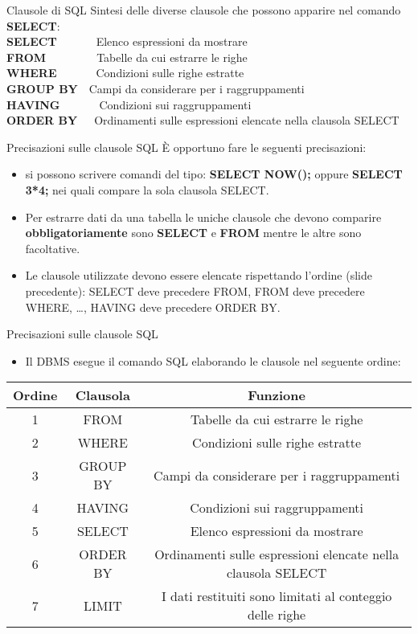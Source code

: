 \begin{frame}{Clausole di SQL}
Sintesi delle diverse clausole che possono apparire nel comando \textbf{SELECT}:
\newline
\\\textbf{SELECT}~~~~~~~Elenco espressioni da mostrare
\\\textbf{FROM}~~~~~~~~~Tabelle da cui estrarre le righe
\\\textbf{WHERE}~~~~~~~Condizioni sulle righe estratte
\\\textbf{GROUP BY}~~Campi da considerare per i raggruppamenti
\\\textbf{HAVING}~~~~~~~Condizioni sui raggruppamenti
\\\textbf{ORDER BY}~~~Ordinamenti sulle espressioni elencate nella clausola SELECT
\end{frame}
%
\begin{frame}{Precisazioni sulle clausole SQL}
\`E opportuno fare le seguenti precisazioni:
\begin{itemize}[<+->]
    \item si possono scrivere comandi del tipo: \textbf{SELECT NOW();} oppure \textbf{SELECT 3*4;} nei quali compare la sola clausola SELECT.
    \item Per estrarre dati da una tabella le uniche clausole che devono comparire \textbf{obbligatoriamente} sono \textbf{SELECT} e \textbf{FROM} mentre le altre sono facoltative.
    \item Le clausole utilizzate devono essere elencate rispettando l'ordine (slide precedente):
    SELECT deve precedere FROM, FROM deve precedere WHERE, \ldots, HAVING deve precedere ORDER BY.
\end{itemize}
\end{frame}
%
\begin{frame}{Precisazioni sulle clausole SQL}
\begin{itemize}
    \item Il DBMS esegue il comando SQL elaborando le clausole nel seguente ordine:
\end{itemize}
\begin{center}
\begin{tabular}{|c|c|c|}
    \hline
    \rowcolor{cyan!30} \textbf{Ordine} & \textbf{Clausola} & \textbf{Funzione} \\
    \hline
    1 & FROM & Tabelle da cui estrarre le righe\\ \hline
    2 & WHERE & Condizioni sulle righe estratte\\ \hline
    3 & GROUP BY & Campi da considerare per i raggruppamenti\\ \hline
    4 & HAVING & Condizioni sui raggruppamenti\\ \hline
    5 & SELECT & Elenco espressioni da mostrare\\ \hline
    6 & ORDER BY & Ordinamenti sulle espressioni elencate nella clausola SELECT\\ \hline
    7 & LIMIT & I dati restituiti sono limitati al conteggio delle righe\\ \hline
\end{tabular}
\end{center}
\end{frame}